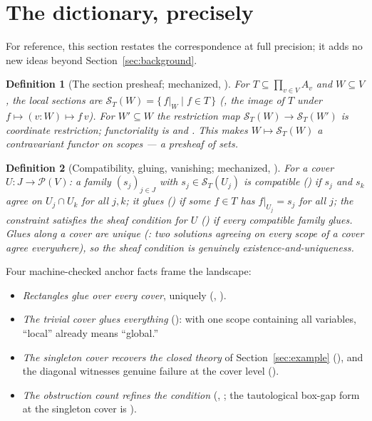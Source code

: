 \documentclass[11pt]{article}
\newtheorem{definition}{Definition}
\newcommand{\Sec}{\mathcal S}
\begin{document}
\section{The dictionary, precisely}
\label{sec:dictionary}

For reference, this section restates the correspondence at full
precision; it adds no new ideas beyond
Section~\ref{sec:background}.

\begin{definition}[The section presheaf; mechanized,
]
For $T \subseteq \prod_{v \in V} A_v$ and $W \subseteq V$, the local
sections are
$\Sec_T(W) = \{\, f|_W \mid f \in T \,\}$
(, the image of $T$ under $f \mapsto (v : W)
\mapsto f\,v$).  For $W' \subseteq W$ the restriction map
$\Sec_T(W) \to \Sec_T(W')$ is coordinate restriction; functoriality
is  and .  This
makes $W \mapsto \Sec_T(W)$ a contravariant functor on scopes --- a
presheaf of sets.
\end{definition}

\begin{definition}[Compatibility, gluing, vanishing; mechanized,
]
For a cover $U : J \to \mathcal P(V)$: a family $(s_j)_{j \in J}$
with $s_j \in \Sec_T(U_j)$ is \emph{compatible}
() if $s_j$ and $s_k$ agree on $U_j \cap U_k$
for all $j,k$; it \emph{glues} () if some $f \in T$
has $f|_{U_j} = s_j$ for all $j$; the constraint satisfies the sheaf
condition for $U$ () if every compatible
family glues.  Glues along a cover are unique
(: two solutions agreeing on every scope of a
cover agree everywhere), so the sheaf condition is genuinely
existence-and-uniqueness.
\end{definition}

Four machine-checked anchor facts frame the landscape:

\begin{itemize}
\item \emph{Rectangles glue over every cover}, uniquely
  (,
  ).
\item \emph{The trivial cover glues everything}
  (): with one scope containing all
  variables, ``local'' already means ``global.''
\item \emph{The singleton cover recovers the closed theory} of
  Section~\ref{sec:example}
  (), and the diagonal
  witnesses genuine failure at the cover level
  ().
\item \emph{The obstruction count refines the condition}
  (,
  ; the tautological box-gap form
  at the singleton cover is
  ).
\end{itemize}
\end{document}
